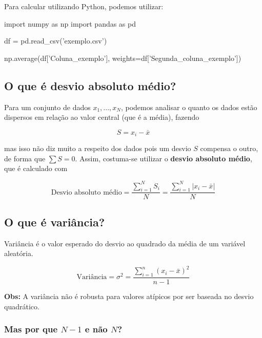 \documentclass{article}
\begin{document}
Para calcular utilizando Python, podemos utilizar:

\begin{pythoncode}
import numpy as np
import pandas as pd 

df = pd.read_csv('exemplo.csv')

np.average(df['Coluna_exemplo'], weights=df['Segunda_coluna_exemplo'])
\end{pythoncode}

\subsection{O que é desvio absoluto médio?}

Para um conjunto de dados ${x_1, ..., x_N}$, podemos analisar o quanto os dados estão dispersos em relação ao valor central (que é a média), fazendo 

\begin{equation*}
    S = x_{i} - \bar{x}
\end{equation*}

mas isso não diz muito a respeito dos dados pois um desvio $S$ compensa o outro, de forma que $\sum S = 0$. Assim, costuma-se utilizar o \textbf{desvio absoluto médio}, que é calculado com

\begin{equation*}
    \text{Desvio absoluto médio} = \frac{\displaystyle \sum_{i = 1}^{N}S_{i}}{N} = \frac{\displaystyle \sum_{i = 1}^{N} |x_i - \bar{x}|}{N}
\end{equation*}

\subsection{O que é variância?}

Variância é o valor esperado do desvio ao quadrado da média de um variável aleatória.

\begin{equation}
    \text{Variância} = \sigma^{2} =  \frac{\displaystyle \sum_{i = 1}^{n} (x_{i} - \bar{x})^{2}}{n - 1}
\end{equation}

\textbf{Obs:} A variância não é robusta para valores atípicos por ser baseada no desvio quadrático.

\subsubsection{Mas por que \texorpdfstring{$N - 1$}{N - 1} e não \texorpdfstring{$N$}{N}?}
\end{document}

